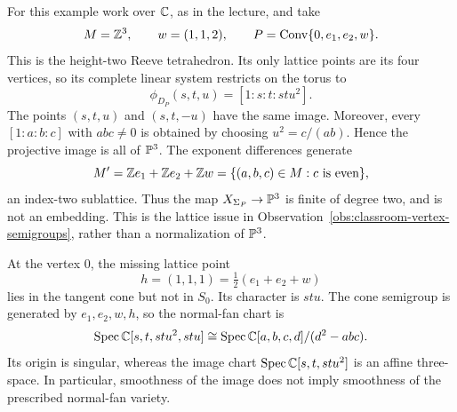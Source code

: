 \begin{example}
\label{ex:classroom-oct19-reeve}
For this example work over \(\mathbb{C}\), as in the lecture, and take
\[
M=\mathbb{Z}^3,\qquad w=(1,1,2),\qquad
P=\operatorname{Conv}\{0,e_1,e_2,w\}.
\]
This is the height-two Reeve tetrahedron. Its only lattice points are
its four vertices, so its complete linear system restricts on the
torus to
\[
\phi_{D_P}(s,t,u)=[1:s:t:stu^2].
\]
The points \((s,t,u)\) and \((s,t,-u)\) have the same image. Moreover,
every \([1:a:b:c]\) with \(abc\ne0\) is obtained by choosing
\(u^2=c/(ab)\). Hence the projective image is all of \(\mathbb{P}^3\).
The exponent differences generate
\[
M'=\mathbb{Z} e_1+\mathbb{Z} e_2+\mathbb{Z} w
=\{(a,b,c)\in M:c\text{ is even}\},
\]
an index-two sublattice. Thus the map
\(X_{\Sigma_P}\to\mathbb{P}^3\) is finite of degree two, and is not an
embedding. This is the lattice issue in
Observation~\ref{obs:classroom-vertex-semigroups}, rather than a normalization of
\(\mathbb{P}^3\).

At the vertex \(0\), the missing lattice point
\[
h=(1,1,1)=\tfrac12(e_1+e_2+w)
\]
lies in the tangent cone but not in \(S_0\). Its character is \(stu\).
The cone semigroup is generated by \(e_1,e_2,w,h\), so the normal-fan
chart is
\[
\operatorname{Spec}\mathbb{C}[s,t,stu^2,stu]
\cong\operatorname{Spec}\mathbb{C}[a,b,c,d]/(d^2-abc).
\]
Its origin is singular, whereas the image chart
\(\operatorname{Spec}\mathbb{C}[s,t,stu^2]\) is an affine three-space. In particular,
smoothness of the image does not imply smoothness of the prescribed
normal-fan variety.

\begin{figure}[htbp]
\centering
{}
\end{figure}
\end{example}
